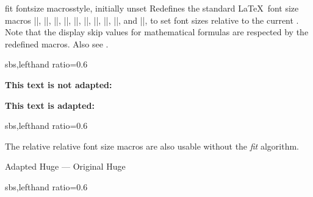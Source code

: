 \clearpage
\begin{docTcbKey}{fit fontsize macros}{}{style, initially unset}
  Redefines the standard \LaTeX\ font size macros
  |\tiny|, |\scriptsize|, |\footnotesize|, |\small|, |\normalsize|,
  |\large|, |\Large|, |\LARGE|, |\huge|, and |\Huge|,
  to set font sizes relative to
  the current . Note that the display skip values for
  mathematical formulas are respected by the redefined macros.
  Also see .

\begin{dispExample*}{sbs,lefthand ratio=0.6}

\begin{tcolorbox}[fit to height=4cm]
  {\Large\bfseries This text is
             not adapted:\par}
  \lipsum[2]
\end{tcolorbox}

\begin{tcolorbox}[fit to height=4cm,
  fit fontsize macros ]
  {\Large\bfseries This text is adapted:\par}
  \lipsum[2]
\end{tcolorbox}
\end{dispExample*}

\begin{dispExample*}{sbs,lefthand ratio=0.6}

\let\realHuge=\Huge

\begin{tcolorbox}[fit basedim=7pt,
  fontupper=\normalsize,
  fit fontsize macros]
The relative relative font size macros
are also usable without the
\textit{fit} algorithm.\par
{\Huge Adapted Huge} ---
{\realHuge Original Huge}
\end{tcolorbox}

\end{dispExample*}


\begin{dispExample*}{sbs,lefthand ratio=0.6}

\tcboxfit[height=5cm,
  fit fontsize macros,
  fonttitle=\normalsize\bfseries,
  title=Adapted title]
{\lipsum[2]}

\end{dispExample*}
\end{docTcbKey}


